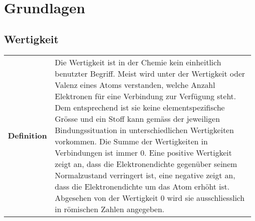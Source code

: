 \section{Grundlagen}

\subsection{Wertigkeit}
\begin{longtable}{p{3cm}p{14cm}}
	\textbf{Definition}
		& Die Wertigkeit ist in der Chemie kein einheitlich benutzter Begriff. Meist wird unter der Wertigkeit oder Valenz eines Atoms verstanden, welche Anzahl Elektronen für eine Verbindung zur Verfügung steht. Dem entsprechend ist sie keine elementspezifische Grösse und ein Stoff kann gemäss der jeweiligen Bindungssituation in unterschiedlichen Wertigkeiten vorkommen. Die Summe der Wertigkeiten in Verbindungen ist immer 0. Eine positive Wertigkeit zeigt an, dass die Elektronendichte gegenüber seinem Normalzustand verringert ist, eine negative zeigt an, dass die Elektronendichte um das Atom erhöht ist. Abgesehen von der Wertigkeit 0 wird sie ausschliesslich in römischen Zahlen angegeben.\\
\end{longtable}

